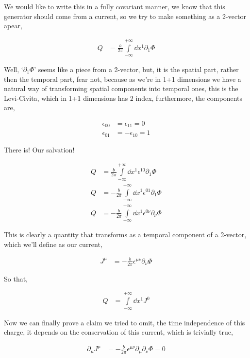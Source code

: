 We would like to write this in a fully covariant manner, we know that this generator should come from a 
current, so we try to make something as a 2-vector apear,

\begin{align}
    Q&=\frac{b}{2\pi}\int\limits_{-\infty}^{+\infty}\dd{x^1}\partial_1\Phi\nonumber
\end{align}

Well, `$\partial_1\Phi$' seems like a piece from a 2-vector, but, it is the spatial part, rather then the 
temporal part, fear not, because as we're in 1+1 dimensions we have a natural way of transforming spatial 
components into temporal ones, this is the Levi-Civita, which in 1+1 dimensions has 2 index, furthermore, 
the components are,

\begin{align}
    \epsilon_{00}&=\epsilon_{11}=0\nonumber\\
    \epsilon_{01}&=-\epsilon_{10}=1\nonumber
\end{align}

There is! Our salvation!

\begin{align}
    Q&=\frac{b}{2\pi}\int\limits_{-\infty}^{+\infty}\dd{x^1}\epsilon^{10}\partial_1\Phi\nonumber\\
    Q&=-\frac{b}{2\pi}\int\limits_{-\infty}^{+\infty}\dd{x^1}\epsilon^{01}\partial_1\Phi\nonumber\\
    Q&=-\frac{b}{2\pi}\int\limits_{-\infty}^{+\infty}\dd{x^1}\epsilon^{0\nu}\partial_\nu\Phi\nonumber
\end{align}

This is clearly a quantity that transforms as a temporal component of a 2-vector, which we'll define as our 
current,

\begin{align}
    J^\mu&=-\frac{b}{2\pi}\epsilon^{\mu\nu}\partial_\nu\Phi\nonumber
\end{align}

So that,

\begin{align}
    Q&=\int\limits_{-\infty}^{+\infty}\dd{x^1}J^0\nonumber
\end{align}

Now we can finally prove a claim we tried to omit, the time independence of this charge, it depends on the 
conservation of this current, which is trivially true,

\begin{align}
    \partial_\mu J^\mu&=-\frac{b}{2\pi}\epsilon^{\mu\nu}\partial_\mu\partial_\nu\Phi=0\nonumber
\end{align}

